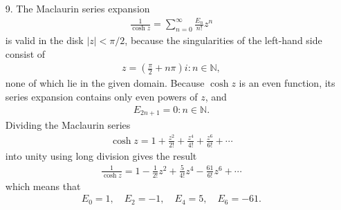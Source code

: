 \documentclass[a4paper,12pt]{article}
\begin{document}
\begin{enumerate}
    \item[9.]
        The Maclaurin series expansion
        \begin{align*}
            \frac{1}{\cosh z} = \sum_{n = 0}^\infty \frac{E_n}{n!} z^n
        \end{align*}
        is valid in the disk $|z| < \pi/2$, because the singularities of the left-hand side consist of 
        \begin{align*}
            z = \left( \frac{\pi}{2} + n\pi \right) i : n \in \mathbb{N},
        \end{align*}
        none of which lie in the given domain. Because $\cosh z$ is an even function, its series expansion contains only even powers of $z$, and
        \begin{align*}
            E_{2n + 1} = 0 : n \in \mathbb{N}.
        \end{align*}
        Dividing the Maclaurin series
        \begin{align*}
            \cosh z = 1 + \frac{z^2}{2!} + \frac{z^4}{4!} + \frac{z^6}{6!} + \cdots
        \end{align*}
        into unity using long division gives the result
        \begin{align*}
            \frac{1}{\cosh z} = 1 - \frac{1}{2!} z^2 + \frac{5}{4!} z^4 - \frac{61}{6!} z^6 + \cdots
        \end{align*}
        which means that
        \begin{align*}
            E_0 = 1, \quad E_2 = -1, \quad E_4 = 5, \quad E_6 = -61.
        \end{align*}
\end{enumerate}
\end{document}
